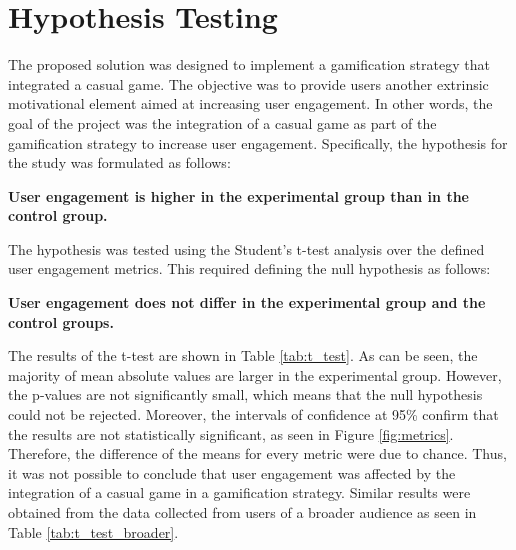 \section{Hypothesis Testing}
The proposed solution was designed to implement a gamification strategy that integrated a casual game. The objective was to provide users another extrinsic motivational element aimed at increasing user engagement. In other words, the goal of the project was the integration of a casual game as part of the gamification strategy to increase user engagement. Specifically, the hypothesis for the study was formulated as follows:

\begin{displayquote}
\textbf{User engagement is higher in the experimental group than in the control group.}
\end{displayquote}

The hypothesis was tested using the Student's t-test analysis over the defined user engagement metrics. This required defining the null hypothesis as follows:

\begin{displayquote}
\textbf{User engagement does not differ in the experimental group and the control groups.}
\end{displayquote}

The results of the t-test are shown in Table \ref{tab:t_test}. As can be seen, the majority of mean absolute values are larger in the experimental group. However, the p-values are not significantly small, which means that the null hypothesis could not be rejected. Moreover, the intervals of confidence at 95\% confirm that the results are not statistically significant, as seen in Figure \ref{fig:metrics}. Therefore, the difference of the means for every metric were due to chance. Thus, it was not possible to conclude that user engagement was affected by the integration of a casual game in a gamification strategy. Similar results were obtained from the data collected from users of a broader audience as seen in Table \ref{tab:t_test_broader}.



